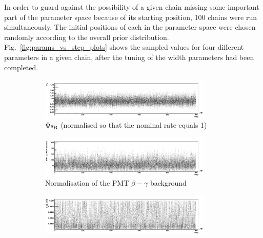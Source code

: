 In order to guard against the possibility of a given chain missing some important part of the parameter space because of its starting position, 100 chains were run simultaneously. The initial positions of each in the parameter space were chosen randomly according to the overall prior distribution. Fig.~\ref{fig:params_vs_step_plots} shows the sampled values for four different parameters in a given chain, after the tuning of the width parameters had been completed.

\begin{figure}
    \centering
    \begin{subfigure}{0.98\textwidth}
        \centering
        \includegraphics[width=0.9\textwidth]{6_SolarAnalysis/images/beight_flux_vs_step_MCMC.png}
        \caption{$\Phi_{\beight{}}$ (normalised so that the nominal rate equals 1)}
        \label{fig:b8_flux_factor_vs_step}
    \end{subfigure}
    \begin{subfigure}{0.98\textwidth}
        \centering
        \includegraphics[width=0.9\textwidth]{6_SolarAnalysis/images/pmt_betagamma_vs_step_MCMC.png}
        \caption{Normalisation of the PMT $\beta-\gamma$ background}
        \label{fig:pmt_vs_step}
    \end{subfigure}
    \begin{subfigure}{0.98\textwidth}
        \centering
        \includegraphics[width=0.9\textwidth]{6_SolarAnalysis/images/dmsq_21_vs_step_MCMC.png}
        \caption{\dmsq{}}
        \label{fig:dmsq_21_vs_step}
    \end{subfigure}

\end{figure}
